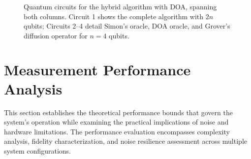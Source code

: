 \documentclass[journal]{IEEEtran}
\begin{document}
\begin{figure}[!t]
{
}
\caption{{Quantum circuits for the hybrid algorithm with DOA, spanning both columns. Circuit 1 shows the complete algorithm with $2n$ qubits; Circuits 2–4 detail Simon's oracle, DOA oracle, and Grover's diffusion operator for $n=4$ qubits.}}
\label{fig:hybrid_circuits}
\end{figure}

\section{Measurement Performance Analysis}

This section establishes the theoretical performance bounds that govern the system's operation while examining the practical implications of noise and hardware limitations. The performance evaluation encompasses complexity analysis, fidelity characterization, and noise resilience assessment across multiple system configurations.
\end{document}
